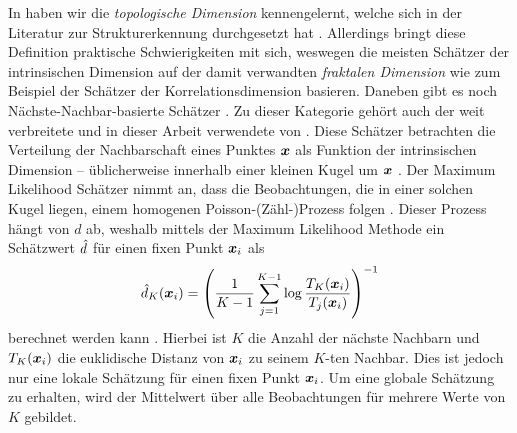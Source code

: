 In  haben wir die \textit{topologische
	Dimension} kennengelernt, welche sich in der Literatur zur Strukturerkennung durchgesetzt hat \parencite[1]{Campadelli.2015}. Allerdings bringt diese Definition praktische Schwierigkeiten mit sich,
weswegen die meisten Schätzer der intrinsischen Dimension auf der damit verwandten
\textit{fraktalen Dimension} wie zum Beispiel der Schätzer der Korrelationsdimension \parencite{Camastra.2002} basieren. Daneben gibt es noch Nächste-Nachbar-basierte Schätzer \parencite[1]{Campadelli.2015}. Zu dieser Kategorie gehört auch der weit verbreitete und in dieser
Arbeit verwendete  von \textcite{Levina.2004}. Diese Schätzer
betrachten die Verteilung der Nachbarschaft eines Punktes $\bm{x}$ als Funktion der
intrinsischen Dimension -- üblicherweise innerhalb einer kleinen Kugel um $\bm{x}$
\parencite[8]{Campadelli.2015}. Der Maximum Likelihood Schätzer nimmt an, dass die Beobachtungen, die
in einer solchen Kugel liegen, einem homogenen Poisson-(Zähl-)Prozess folgen
\parencite[2]{Levina.2004}. Dieser Prozess hängt von $d$ ab, weshalb mittels der Maximum Likelihood
Methode ein Schätzwert $\hat{d}$ für einen fixen Punkt $\bm{x}_i$ als
\begin{equation}
	\hat{d}_K(\bm{x}_i) = \left( \frac{1}{K - 1} \sum_{j=1}^{K - 1} \log \frac{T_K(\bm{x}_i)}{T_j(\bm{x}_i)} \right)^{-1}
\end{equation}
berechnet werden kann \parencite[4]{Levina.2004}. Hierbei ist $K$ die Anzahl der nächste Nachbarn und $T_{K}(\bm{x}_i)$ die
euklidische Distanz von $\bm{x}_i$ zu seinem $K$-ten Nachbar. Dies ist jedoch nur eine lokale
Schätzung für einen fixen Punkt $\bm{x}_i$. Um eine globale Schätzung zu erhalten, wird der
Mittelwert über alle Beobachtungen für mehrere Werte von $K$ gebildet.
